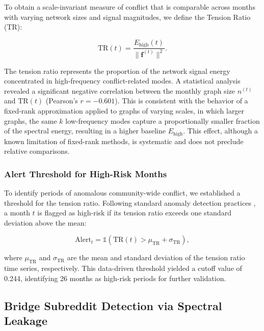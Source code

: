 \documentclass[a4paper,fleqn]{cas-dc}
\begin{document}
To obtain a scale-invariant measure of conflict that is comparable across months with varying network sizes and signal magnitudes, we define the Tension Ratio (TR):

\begin{equation}
\label{eq:tension_ratio}
\text{TR}(t) = \frac{E_{\text{high}}(t)}{\|\mathbf{f}^{(t)}\|^2}.
\end{equation}

The tension ratio represents the proportion of the network signal energy concentrated in high-frequency conflict-related modes. A statistical analysis revealed a significant negative correlation between the monthly graph size \( n^{(t)} \) and \( \text{TR}(t) \) (Pearson's \( r = -0.601 \)). This is consistent with the behavior of a fixed-rank approximation applied to graphs of varying scales, in which larger graphs, the same \( k \) low-frequency modes capture a proportionally smaller fraction of the spectral energy, resulting in a higher baseline \( E_{\text{high}} \). This effect, although a known limitation of fixed-rank methods, is systematic and does not preclude relative comparisons.

\subsubsection{Alert Threshold for High-Risk Months}
\label{subsec:alert_threshold}

To identify periods of anomalous community-wide conflict, we established a threshold for the tension ratio. Following standard anomaly detection practices \cite{chandola2009anomaly}, a month \( t \) is flagged as high-risk if its tension ratio exceeds one standard deviation above the mean:

\begin{equation}
\label{eq:alert_threshold}
\text{Alert}_t = \mathbb{1}\left( \text{TR}(t) > \mu_{\text{TR}} + \sigma_{\text{TR}} \right),
\end{equation}

where \( \mu_{\text{TR}} \) and \( \sigma_{\text{TR}} \) are the mean and standard deviation of the tension ratio time series, respectively. This data-driven threshold yielded a cutoff value of 0.244, identifying 26 months as high-risk periods for further validation.


\subsection{Bridge Subreddit Detection via Spectral Leakage}
\label{sec:objective3_bridge}
\end{document}
